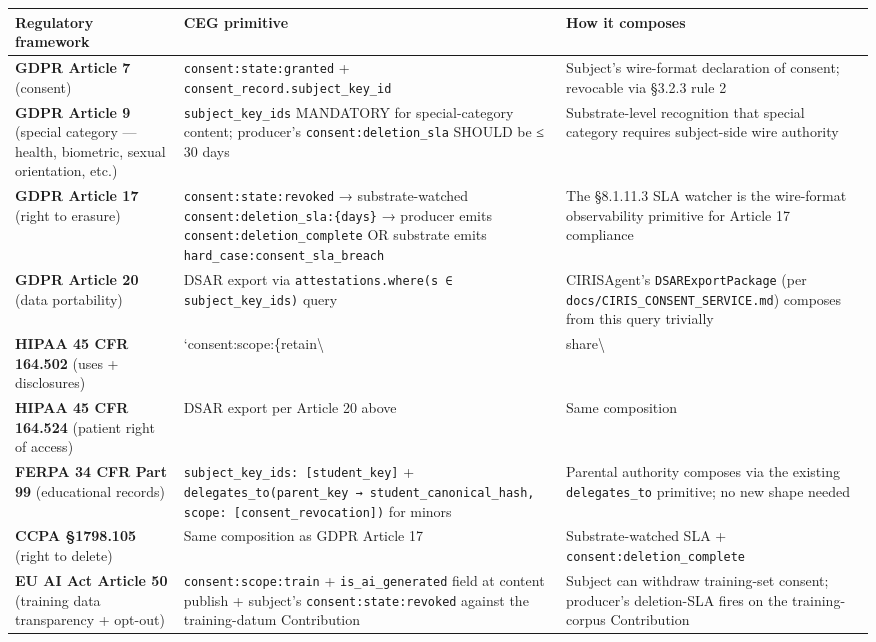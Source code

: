 \documentclass[10pt]{article}
\begin{document}
{\footnotesize
\begin{longtable}{|p{5.33cm}|p{5.33cm}|p{5.33cm}|}\hline
\textbf{Regulatory framework} & \textbf{CEG primitive} & \textbf{How it composes} \\ \hline\endhead
\textbf{GDPR Article 7} (consent) & \texttt{consent:state:granted} + \texttt{consent\_record.subject\_key\_id} & Subject's wire-format declaration of consent; revocable via §3.2.3 rule 2 \\ \hline
\textbf{GDPR Article 9} (special category — health, biometric, sexual orientation, etc.) & \texttt{subject\_key\_ids} MANDATORY for special-category content; producer's \texttt{consent:deletion\_sla} SHOULD be ≤ 30 days & Substrate-level recognition that special category requires subject-side wire authority \\ \hline
\textbf{GDPR Article 17} (right to erasure) & \texttt{consent:state:revoked} → substrate-watched \texttt{consent:deletion\_sla:\{days\}} → producer emits \texttt{consent:deletion\_complete} OR substrate emits \texttt{hard\_case:consent\_sla\_breach} & The §8.1.11.3 SLA watcher is the wire-format observability primitive for Article 17 compliance \\ \hline
\textbf{GDPR Article 20} (data portability) & DSAR export via \texttt{attestations.where(s ∈ subject\_key\_ids)} query & CIRISAgent's \texttt{DSARExportPackage} (per \texttt{docs/CIRIS\_CONSENT\_SERVICE.md}) composes from this query trivially \\ \hline
\textbf{HIPAA 45 CFR 164.502} (uses + disclosures) & `consent:scope:\{retain\textbackslash{} & share\textbackslash{} \\ \hline
\textbf{HIPAA 45 CFR 164.524} (patient right of access) & DSAR export per Article 20 above & Same composition \\ \hline
\textbf{FERPA 34 CFR Part 99} (educational records) & \texttt{subject\_key\_ids: [student\_key]} + \texttt{delegates\_to(parent\_key → student\_canonical\_hash, scope: [consent\_revocation])} for minors & Parental authority composes via the existing \texttt{delegates\_to} primitive; no new shape needed \\ \hline
\textbf{CCPA §1798.105} (right to delete) & Same composition as GDPR Article 17 & Substrate-watched SLA + \texttt{consent:deletion\_complete} \\ \hline
\textbf{EU AI Act Article 50} (training data transparency + opt-out) & \texttt{consent:scope:train} + \texttt{is\_ai\_generated} field at content publish + subject's \texttt{consent:state:revoked} against the training-datum Contribution & Subject can withdraw training-set consent; producer's deletion-SLA fires on the training-corpus Contribution \\ \hline

\end{longtable}}
\end{document}
